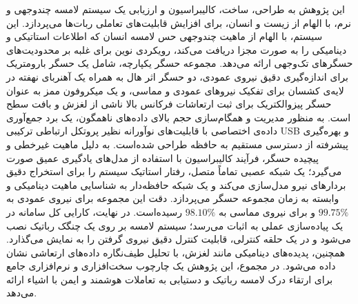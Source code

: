 {این پژوهش به طراحی، ساخت، کالیبراسیون و ارزیابی یک سیستم لامسه چندوجهی و نرم، با الهام از زیست و انسان، برای افزایش قابلیت‌های تعاملی ربات‌ها می‌پردازد. این سیستم، با الهام از ماهیت چندوجهی حس لامسه انسان که اطلاعات استاتیکی و دینامیکی را به صورت مجزا دریافت می‌کند، رویکردی نوین برای غلبه بر محدودیت‌های حسگرهای تک‌وجهی ارائه می‌دهد.
مجموعه حسگر یکپارچه، شامل یک حسگر بارومتریک برای اندازه‌گیری دقیق نیروی عمودی، دو حسگر اثر هال به همراه یک آهنربای نهفته در لایه‌ی کشسان برای تفکیک نیروهای عمودی و مماسی، و یک میکروفون ممز به عنوان حسگر پیزوالکتریک برای ثبت ارتعاشات فرکانس بالا ناشی از لغزش و بافت سطح است. به منظور مدیریت و همگام‌سازی حجم بالای داده‌های ناهمگون، یک برد جمع‌آوری داده‌ی اختصاصی با قابلیت‌های نوآورانه نظیر پروتکل ارتباطی ترکیبی USB و بهره‌گیری پیشرفته از دسترسی مستقیم به حافظه طراحی شده‌است.
به دلیل ماهیت غیرخطی و پیچیده‌ حسگر، فرآیند کالیبراسیون با استفاده از مدل‌های یادگیری عمیق صورت می‌گیرد؛ یک شبکه عصبی تماماً متصل، رفتار استاتیک سیستم را برای استخراج دقیق بردارهای نیرو مدل‌سازی می‌کند و یک شبکه حافظه‌دار به شناسایی ماهیت دینامیکی و وابسته به زمان مجموعه حسگر می‌پردازد. دقت این مجموعه برای نیروی عمودی به 
$99.75\%$
و برای نیروی مماسی به 
$98.10\%$ 
رسیده‌است.
در نهایت، کارایی کل سامانه در یک پیاده‌سازی عملی به اثبات می‌رسد؛ سیستم لامسه‌ بر روی یک چنگک رباتیک نصب می‌شود و در یک حلقه کنترلی، قابلیت کنترل دقیق نیروی گرفتن را به نمایش می‌گذارد. همچنین، پدیده‌های دینامیکی مانند لغزش، با تحلیل طیف‌نگاره داده‌های ارتعاشی نشان داده می‌شود. در مجموع، این پژوهش یک چارچوب سخت‌افزاری و نرم‌افزاری جامع برای ارتقاء درک لامسه رباتیک و دستیابی به تعاملات هوشمند و ایمن با اشیاء ارائه می‌دهد.


}
